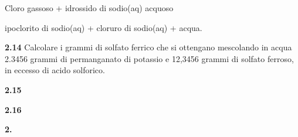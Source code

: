 \begin{center}
    Cloro gassoso + idrossido di sodio(aq) acquoso \ce{->} 
    
    \ce{->} ipoclorito di sodio(aq) + cloruro di sodio(aq) + acqua. 
\end{center}




\vspace{0.2cm}\textbf{2.14} Calcolare i grammi di solfato ferrico che si ottengano mescolando in acqua 2.3456 grammi di permanganato di potassio  e 12,3456 grammi di solfato ferroso, in eccesso di acido solforico.

\vspace{0.2cm}\textbf{2.15} 

\vspace{0.2cm}\textbf{2.16} 

\vspace{0.2cm}\textbf{2.} 